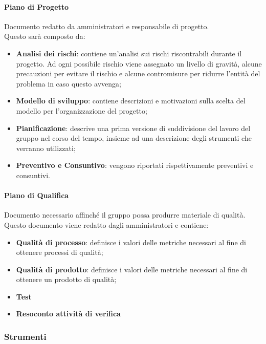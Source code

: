     \paragraph{Piano di Progetto}  \hfill \break
    Documento redatto da amministratori e responsabile di progetto. \\
Questo sarà composto da:
    \begin{itemize}
        \item \textbf{Analisi dei rischi}: contiene un'analisi sui rischi riscontrabili durante il progetto. Ad ogni possibile rischio viene assegnato un livello di gravità, alcune precauzioni per evitare il rischio e alcune contromisure per ridurre l'entità del problema in caso questo avvenga; 
        \item \textbf{Modello di sviluppo}: contiene descrizioni e motivazioni sulla scelta del modello per l'organizzazione del progetto;
        \item \textbf{Pianificazione}: descrive una prima versione di suddivisione del lavoro del gruppo nel corso del tempo, insieme ad una descrizione degli strumenti che verranno utilizzati;
        \item \textbf{Preventivo e Consuntivo}: vengono riportati rispettivamente preventivi e consuntivi.
    \end{itemize}

    \paragraph{Piano di Qualifica}  \hfill \break
    Documento necessario affinché il gruppo possa produrre materiale di qualità. \\
Questo documento viene redatto dagli amministratori e contiene:
    \begin{itemize}
        \item \textbf{Qualità di processo}: definisce i valori delle metriche necessari al fine di ottenere processi di qualità;
        \item \textbf{Qualità di prodotto}: definisce i valori delle metriche necessari al fine di ottenere un prodotto di qualità;
        \item \textbf{Test}
        \item \textbf{Resoconto attività di verifica}
    \end{itemize}
    
\subsubsection{Strumenti}
